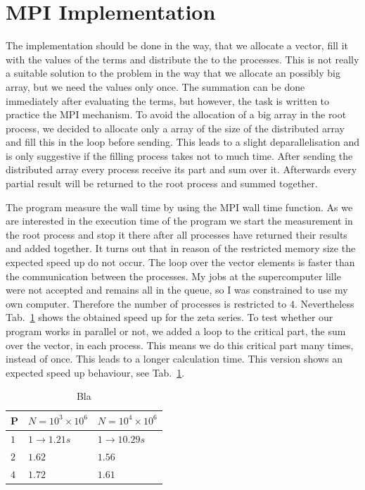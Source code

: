 \section{MPI Implementation}

The implementation should be done in the way, that we allocate a vector, fill it with the values of the terms and distribute the to the processes. This is not really a suitable solution to the problem in the way that we allocate an possibly big array, but we need the values only once. The summation can be done immediately after evaluating the terms, but however, the task is written to practice the MPI mechanism. To avoid the allocation of a big array in the root process, we decided to allocate only a array of the size of the distributed array and fill this in the loop before sending. This leads to a slight deparallelisation and is only suggestive if the filling process takes not to much time. After sending the distributed array every process receive its part and sum over it. Afterwards every partial result will be returned to the root process and summed together. 

The program measure the wall time by using the MPI wall time function. As we are interested in the execution time of the program we start the measurement in the root process and stop it there after all processes have returned their results and added together. It turns out that in reason of the restricted memory size the expected speed up do not occur. The loop over the vector elements is faster than the communication between the processes. My jobs at the supercomputer lille were not accepted and remains all in the queue, so I was constrained to use my own computer. Therefore the number of processes is restricted to $4$. Nevertheless Tab.~\ref{} shows the obtained speed up for the zeta series.
To test whether our program works in parallel or not, we added a loop to the critical part, the sum over the vector, in each process. This means we do this critical part many times, instead of once. This leads to a longer calculation time. This version shows an expected speed up behaviour, see Tab.~\ref{tab:speed_up2}.\begin{table}
\centering
    \begin{tabular}{| l | l | l |}
    
    \hline
    P & $N = 10^3 \times 10^6$ & $N = 10^4 \times 10^6$ \\  \hline
	$1$ & $1 \rightarrow 1.21 s$ & $1 \rightarrow 10.29 s$\\    
    $2$ & $1.62$ & $1.56$\\
    $4$ & $1.72$ & $1.61$\\
    \hline
    
    \end{tabular}
    \caption{Bla}
    \label{tab:speed_up2}
\end{table}

